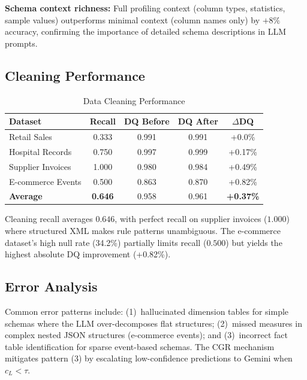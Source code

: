 \documentclass[conference]{IEEEtran}
\begin{document}
\textbf{Schema context richness:} Full profiling context (column types,
statistics, sample values) outperforms minimal context (column names only)
by $+8\%$ accuracy, confirming the importance of detailed schema
descriptions in LLM prompts.


\subsection{Cleaning Performance}

\begin{table}[htbp]
\centering
\caption{Data Cleaning Performance}
\label{tab:cleaning}
\begin{tabular}{lcccc}
\toprule
Dataset & Recall & DQ Before & DQ After & $\Delta$DQ \\
\midrule
Retail Sales & 0.333 & 0.991 & 0.991 & +0.0\% \\
Hospital Records & 0.750 & 0.997 & 0.999 & +0.17\% \\
Supplier Invoices & 1.000 & 0.980 & 0.984 & +0.49\% \\
E-commerce Events & 0.500 & 0.863 & 0.870 & +0.82\% \\
\midrule
\textbf{Average} & \textbf{0.646} & 0.958 & 0.961 & \textbf{+0.37\%} \\
\bottomrule
\end{tabular}
\end{table}

Cleaning recall averages $0.646$, with perfect recall on supplier invoices
($1.000$) where structured XML makes rule patterns unambiguous. The
e-commerce dataset's high null rate (34.2\%) partially limits recall ($0.500$)
but yields the highest absolute DQ improvement (+0.82\%).

\subsection{Error Analysis}

Common error patterns include: (1)~hallucinated dimension tables for
simple schemas where the LLM over-decomposes flat structures; (2)~missed
measures in complex nested JSON structures (e-commerce events); and
(3)~incorrect fact table identification for sparse event-based schemas.
The CGR mechanism mitigates pattern (3) by escalating low-confidence
predictions to Gemini when $c_L < \tau$.

\end{document}
